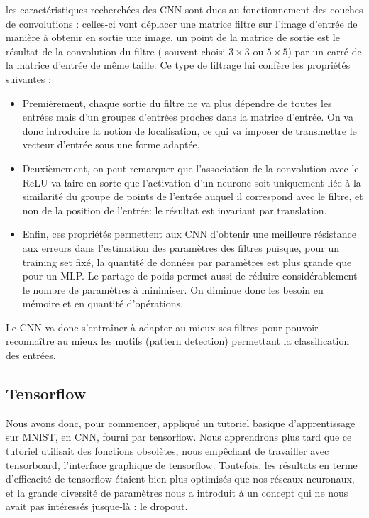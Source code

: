 \documentclass[
    10pt,
    a4paper,
    oneside,
    headinclude,footinclude,
    BCOR=5mm,
    captions=tableabove
]{scrartcl}
\begin{document}
les caractéristiques recherchées des CNN sont dues au fonctionnement des couches de convolutions : celles-ci vont déplacer une matrice filtre sur l'image d'entrée de manière à obtenir en sortie une image, un point de la matrice de sortie est le résultat de la convolution du filtre ( souvent choisi $3\times3$ ou $5\times5$) par un carré de la matrice d'entrée de même taille.
Ce type de filtrage lui confère les propriétés suivantes :
\begin{itemize}
	\item Premièrement, chaque sortie du filtre ne va plus dépendre de toutes les entrées mais d'un groupes d'entrées proches dans la matrice d'entrée. On va donc introduire la notion de localisation, ce qui va imposer de transmettre le vecteur d'entrée sous une forme adaptée.
	\item Deuxièmement, on peut remarquer que l'association de la convolution avec le ReLU va faire en sorte que l'activation d'un neurone soit uniquement liée à la similarité du groupe de points de l'entrée auquel il correspond avec le filtre, et non de la position de l'entrée: le résultat est invariant par translation.
	\item Enfin, ces propriétés permettent aux CNN d'obtenir une meilleure résistance aux erreurs dans l'estimation des paramètres des filtres puisque, pour un training set fixé, la quantité de données par paramètres est plus grande que pour un MLP. Le partage de poids permet aussi de réduire considérablement le nombre de paramètres à minimiser. On diminue donc les besoin en mémoire et en quantité d'opérations.
\end{itemize}

Le CNN va donc s'entraîner à adapter au mieux ses filtres pour pouvoir reconnaître au mieux les motifs (pattern detection) permettant la classification des entrées.

\subsection{Tensorflow}

Nous avons donc, pour commencer, appliqué un tutoriel basique d'apprentissage sur MNIST, en CNN, fourni par tensorflow. Nous apprendrons plus tard que ce tutoriel utilisait des fonctions obsolètes, nous empêchant de travailler avec tensorboard, l'interface graphique de tensorflow. Toutefois, les résultats en terme d'efficacité de tensorflow étaient bien plus optimisés que nos réseaux neuronaux, et la grande diversité de paramètres nous a introduit à un concept qui ne nous avait pas intéressés jusque-là : le dropout.
\end{document}
